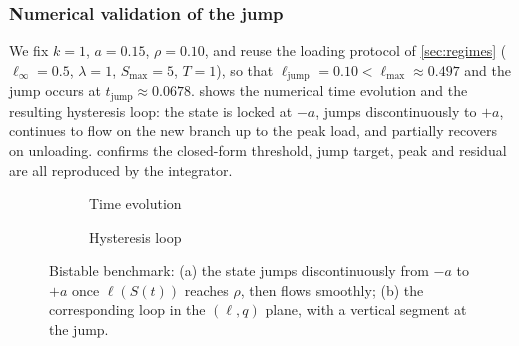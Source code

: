 \subsubsection{Numerical validation of the jump}\label{sec:regimes2}

We fix $k=1$, $a=0.15$, $\rho=0.10$, and reuse the loading protocol of
\cref{sec:regimes} ($\ell_\infty=0.5$, $\lambda=1$, $S_{\max}=5$,
$T=1$), so that $\ell_{\mathrm{jump}}=0.10<\ell_{\max}\approx0.497$ and
the jump occurs at $t_{\mathrm{jump}}\approx0.0678$.
 shows the numerical time evolution and the resulting
hysteresis loop: the state is locked at $-a$, jumps discontinuously to
$+a$, continues to flow on the new branch up to the peak load, and
partially recovers on unloading.  confirms the
closed-form threshold, jump target, peak and residual are all
reproduced by the integrator.

\begin{figure}[t]
  \centering
  \begin{subfigure}[c]{0.47\textwidth}
    \centering
    \caption{Time evolution}
  \end{subfigure}
  \hfill
  \begin{subfigure}[c]{0.47\textwidth}
    \centering
    \caption{Hysteresis loop}
  \end{subfigure}
  \caption{Bistable benchmark: (a) the state jumps discontinuously from
  $-a$ to $+a$ once $\ell(S(t))$ reaches $\rho$, then flows smoothly;
  (b) the corresponding loop in the $(\ell,q)$ plane, with a vertical
  segment at the jump.}
  \label{fig:time2}
\end{figure}

